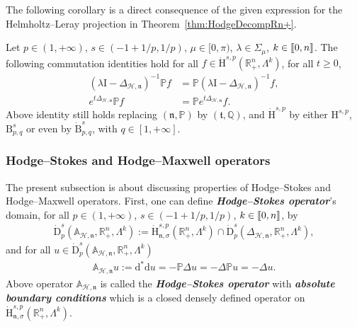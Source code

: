 \documentclass[10pt]{amsart}
\theoremstyle{definition}\newtheorem{defi}[theo]{Definition}\newtheorem{rema}[theo]{Remark}\newtheorem{exam}[theo]{Example}\newtheorem{exem}[theo]{Example}\newtheorem{nota}[theo]{Notation}
\newcommand{\bbP}{\mathbb{P}}
\newcommand{\bbA}{\mathbb{A}}
\newcommand{\bbR}{\mathbb{R}}
\newcommand{\bbQ}{\mathbb{Q}}
\newcommand{\rmH}{\mathrm{H}}%
\newcommand{\rmB}{\mathrm{B}}
\newcommand{\rmd}{\mathrm{d}}
\newcommand{\rmD}{\mathrm{D}}
\newcommand{\rmI}{\mathrm{I}}
\newcommand{\clH}{\mathcal{H}}
\newcommand{\fkn}{\mathfrak{n}}
\newcommand{\fkt}{\mathfrak{t}}
\newcommand{\llbracket}{\mathopen{[\mkern -2.7mu[}}
\newcommand{\rrbracket}{\mathclose{]\mkern -2.7mu]}}
\newcommand{\llb}{\llbracket}
\newcommand{\rrb}{\rrbracket}
\begin{document}
The following corollary is a direct consequence of the given expression for the Helmholtz--Leray projection in Theorem~\ref{thm:HodgeDecompRn+}.

\begin{coro}\label{cor:commutrelationHodgeProjectorHspBspqRn+}
Let $p\in(1,+\infty)$, $s\in(-1+1/p,1/p)$,
$\mu\in[0,\pi)$, $\lambda\in\Sigma_\mu$, $k\in\llb 0,n\rrb$. The following commutation identities hold for all $f\in\dot{\rmH}^{s,p}(\bbR^n_+,\Lambda^k)$, for all $t\geqslant 0$,
\begin{align*}
\left(\lambda \rmI -\Delta_{\clH,\fkn}\right)^{-1} \bbP f &= \bbP\left(\lambda \rmI -\Delta_{\clH,\fkn}\right)^{-1} f ,\\
e^{t\Delta_{\clH,\fkn}} \bbP f &= \bbP e^{t\Delta_{\clH,\fkn}} f .
\end{align*}
Above identity still holds replacing $(\fkn,\bbP)$ by $(\fkt,\bbQ)$, and $\dot{\rmH}^{s,p}$ by either ${\rmH}^{s,p}$, ${\rmB}^s_{p,q}$ or even by $\dot{\rmB}^s_{p,q}$, with $q\in[1,+\infty]$.
\end{coro}

\subsubsection{Hodge--Stokes and Hodge--Maxwell operators}

The present subsection is about discussing properties of Hodge--Stokes and Hodge--Maxwell operators. First, one can define \textbf{\emph{Hodge--Stokes operator}}'s domain, for all $p\in(1,+\infty)$, $s\in(-1+1/p,1/p)$, $k\in\llb 0,n\rrb$, by
\begin{align}\label{eq:domainHodgeStokesAbsBC}
\dot{\rmD}^{s}_{p}\left(\bbA_{\clH,\fkn},\bbR^n_+,\Lambda^k\right):= \dot{\rmH}^{s,p}_{\fkn,\sigma}\left(\bbR^n_+,\Lambda^k\right)\cap\dot{\rmD}^{s}_{p}\left(\Delta_{\clH,\fkn},\bbR^n_+,\Lambda^k\right),
\end{align}
and for all $u\in \dot{\rmD}^{s}_{p}(\bbA_{\clH,\fkn},\bbR^n_+,\Lambda^k)$
\begin{align}\label{eq:defHodgeStokesAbsBC}
\bbA_{\clH,\fkn} u:= \rmd^\ast\rmd u = -\bbP\Delta u = -\Delta \bbP u =-\Delta u .
\end{align}
Above operator $\bbA_{\clH,\fkn}$ is called the \textbf{\emph{Hodge--Stokes operator}} with \textbf{\emph{absolute boundary conditions}} which is a closed densely defined operator on $\dot{\rmH}^{s,p}_{{\fkn},\sigma}(\bbR^n_+,\Lambda^k)$.
\end{document}
